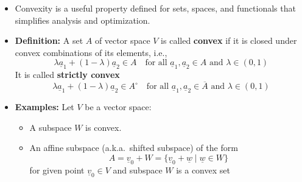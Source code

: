 \documentclass[11pt,twoside]{report}
\newcommand{\vecnot}{\underline}
\newcommand{\Interior}[1]{\ensuremath{{#1}^{\circ}}}
\newcommand{\Closure}[1]{\ensuremath{\overline{#1}}}
\begin{document}
\begin{itemize}

\item Convexity is a useful property defined for sets, spaces, and functionals that simplifies analysis and optimization.


\item \textbf{Definition:} A set $A$ of vector space $V$ is called \textbf{convex} if it is closed under convex combinations of its elements, i.e., 
\[
\lambda \vecnot{a}_1 + (1- \lambda) \vecnot{a}_2 \in A \quad \text{for all $\vecnot{a}_1, \vecnot{a}_2 \in A$ and $\lambda \in (0,1)$}
\]
It is called \textbf{strictly convex} 
\[
\lambda \vecnot{a}_1 + (1- \lambda) \vecnot{a}_2 \in \Interior{A} \quad \text{for all $\vecnot{a}_1, \vecnot{a}_2 \in \Closure{A}$ and $\lambda \in (0,1)$}
\]
\begin{center}
\end{center}


\item \textbf{Examples:} Let $V$ be a vector space:
\begin{itemize}
\item A subspace $W$  is convex. 

\item An affine subspace (a.k.a.\ shifted subspace) of the form 
\[
A = \vecnot{v}_0 + W = \{ \vecnot{v}_0 + \vecnot{w} \mid \vecnot{w} \in W\}  %
\]
for given point $\vecnot{v}_0 \in V$ and subspace $W$ is a convex set


\end{itemize}
\end{itemize}
\end{document}
